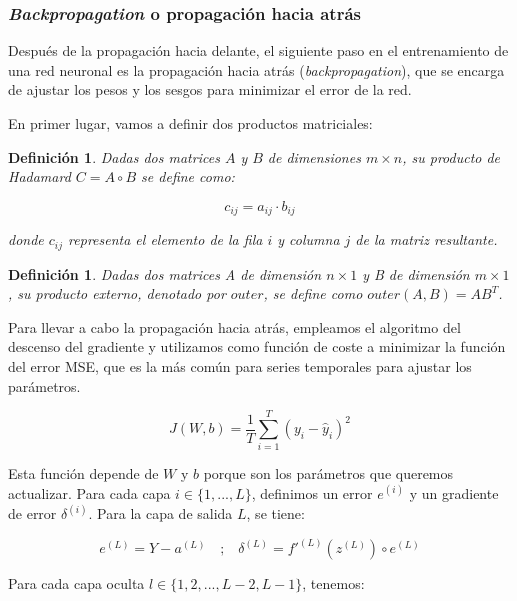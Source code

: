 \documentclass[12pt,twoside]{article}
\newtheorem{definition}[theorem]{Definición}
\begin{document}
\subsubsection{\textit{Backpropagation} o propagación hacia atrás}\label{sec:13}

Después de la propagación hacia delante, el siguiente paso en el entrenamiento de una red neuronal es la propagación hacia atrás (\textit{backpropagation}), que se encarga de ajustar los pesos y los sesgos para minimizar el error de la red.

En primer lugar, vamos a definir dos productos matriciales:

\begin{definition} Dadas dos matrices $A$ y $B$ de dimensiones $m \times n$, su producto de Hadamard $C = A \circ B$ se define como:

\begin{equation}
c_{ij} = a_{ij} \cdot b_{ij}
\end{equation}

donde \(c_{ij}\) representa el elemento de la fila \(i\) y columna \(j\) de la matriz resultante.
\end{definition}

\begin{definition}
Dadas dos matrices A de dimensión $n \times 1$ y B de dimensión $m \times 1$, su producto externo, denotado por $outer$, se define como $outer(A,B) = AB^T$.
\end{definition}

Para llevar a cabo la propagación hacia atrás, empleamos el algoritmo del descenso del gradiente y utilizamos como función de coste a minimizar la función del error MSE, que es la más común para series temporales para ajustar los parámetros.

\begin{equation}
J(W, b) = \frac{1}{T} \sum_{i=1}^{T} (y_i - \hat{y}_i)^2
\end{equation}

Esta función depende de $W$ y $b$ porque son los parámetros que queremos actualizar. Para cada capa $i \in \{1, ..., L\}$, definimos un error $e^{(i)}$ y un gradiente de error $\delta^{(i)}$. Para la capa de salida $L$, se tiene:

\begin{equation}
e^{(L)} = Y - a^{(L)}
\quad \text{;} \quad
\delta^{(L)} = f'^{(L)}(z^{(L)}) \circ e^{(L)}
\end{equation}

Para cada capa oculta $l \in \{1,2, ..., L-2, L-1\}$, tenemos:
\end{document}
